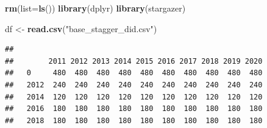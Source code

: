 \documentclass[
]{article}
\author{}
\date{\vspace{-2.5em}}
\newenvironment{Shaded}{\begin{snugshade}}{\end{snugshade}}
\newcommand{\AttributeTok}[1]{\textcolor[rgb]{0.13,0.29,0.53}{#1}}
\newcommand{\FunctionTok}[1]{\textcolor[rgb]{0.13,0.29,0.53}{\textbf{#1}}}
\newcommand{\NormalTok}[1]{#1}
\newcommand{\OtherTok}[1]{\textcolor[rgb]{0.56,0.35,0.01}{#1}}
\newcommand{\SpecialCharTok}[1]{\textcolor[rgb]{0.81,0.36,0.00}{\textbf{#1}}}
\newcommand{\StringTok}[1]{\textcolor[rgb]{0.31,0.60,0.02}{#1}}
\begin{document}
\begin{Shaded}
\begin{Highlighting}[]
\FunctionTok{rm}\NormalTok{(}\AttributeTok{list=}\FunctionTok{ls}\NormalTok{())}
\FunctionTok{library}\NormalTok{(dplyr)}
\FunctionTok{library}\NormalTok{(stargazer)}

\NormalTok{df }\OtherTok{\textless{}{-}} \FunctionTok{read.csv}\NormalTok{(}\StringTok{"base\_stagger\_did.csv"}\NormalTok{)}
\end{Highlighting}
\end{Shaded}

\begin{Shaded}
\end{Shaded}

\begin{verbatim}
##       
##        2011 2012 2013 2014 2015 2016 2017 2018 2019 2020
##   0     480  480  480  480  480  480  480  480  480  480
##   2012  240  240  240  240  240  240  240  240  240  240
##   2014  120  120  120  120  120  120  120  120  120  120
##   2016  180  180  180  180  180  180  180  180  180  180
##   2018  180  180  180  180  180  180  180  180  180  180
\end{verbatim}
\end{document}
